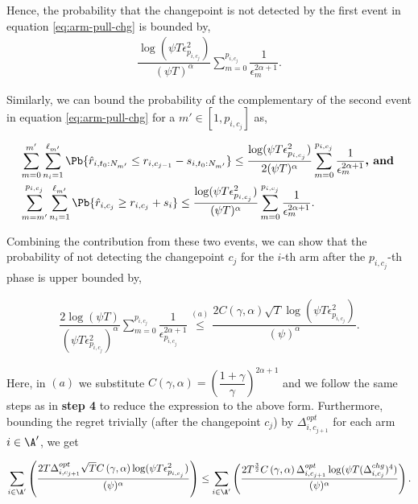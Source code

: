 \begin{customproof}{3}
Hence, the probability that the changepoint is not detected by the first event in equation \ref{eq:arm-pull-chg} is bounded by,
\begin{align*}
\dfrac{\log(\psi T \epsilon_{p_{i,c_j}}^2)}{(\psi T )^{\alpha}}\sum_{m=0}^{p_{i,c_j}}\dfrac{1}{\epsilon_{m}^{2\alpha + 1}}.
\end{align*}

Similarly, we can bound the probability of the complementary of the second event in equation \ref{eq:arm-pull-chg} for a $m'\in[1,p_{i,c_j}]$ as,

\begin{align*}
&\sum_{m=0}^{m'}\sum_{n_i=1}^{\ell_{m'}}\Pb\lbrace \hat{r}_{i,t_0:N_{m'}} \leq  r_{i,c_{j-1}} - s_{i,t_0:N_{m'}} \rbrace\leq \dfrac{\log(\psi T\epsilon_{p_{i,c_j}}^2)}{2(\psi T)^{\alpha}}\sum_{m=0}^{p_{i,c_j}}\dfrac{1}{\epsilon_{m}^{2\alpha + 1}} \textbf{,  and  }\\
&\sum_{m=m'}^{p_{i,c_j}}\sum_{n_i=1}^{\ell_{m'}}\Pb\lbrace \hat{r}_{i,c_j} \geq  r_{i,c_j} + s_i \rbrace\leq \dfrac{\log(\psi T\epsilon_{p_{i,c_j}}^2)}{(\psi T)^{\alpha}}\sum_{m=0}^{p_{i,c_j}}\dfrac{1}{\epsilon_{m}^{2\alpha + 1}}.
\end{align*}


Combining the contribution from these two events, we can show that the probability of not detecting the changepoint $c_j$ for the $i$-th arm after the $p_{i,c_j}$-th phase is upper bounded by,

\begin{align*}
\dfrac{2\log(\psi T)}{(\psi T\epsilon_{p_{i,c_j}}^2)^{\alpha}}\sum_{m=0}^{p_{i,c_j}}\dfrac{1}{\epsilon_{p_{i,c_j}}^{2\alpha + 1}} \overset{(a)}{\leq} \dfrac{2C\left(\gamma,\alpha\right)\sqrt{T}\log(\psi T \epsilon_{p_{i,c_j}}^2)}{(\psi)^{\alpha}} .
\end{align*}

Here, in $(a)$ we substitute $C\left(\gamma,\alpha\right)=\left( \dfrac{1+\gamma}{\gamma}\right)^{2\alpha + 1}$ and we follow the same steps as in \textbf{step 4} to reduce the expression to the above form. Furthermore, bounding the regret trivially (after the changepoint $c_j$) by $\Delta^{opt}_{i,c_{j+1}}$ for each arm $i\in\A'$, we get 


\begin{align*}
\sum_{i\in\A'}\left( \dfrac{2T\Delta^{opt}_{i,c_{j+1}}\sqrt{T}C\left(\gamma,\alpha\right)\log(\psi T \epsilon_{p_{i,c_j}}^2)}{(\psi)^{\alpha}} \right) \leq \sum_{i\in\A'}\left( \dfrac{2T^{\frac{3}{2}}C\left(\gamma,\alpha\right)\Delta^{opt}_{i,c_{j+1}}\log(\psi T (\Delta^{chg}_{i,c_j})^4)}{(\psi)^{\alpha}} \right).
\end{align*}



\end{customproof}
